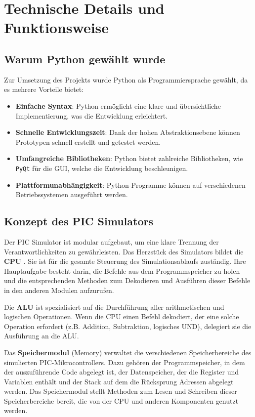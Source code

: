 \chapter{Technische Details und Funktionsweise}

\section{Warum Python gewählt wurde}
Zur Umsetzung des Projekts wurde Python als Programmiersprache gewählt, da es mehrere Vorteile bietet:
\begin{itemize}
    \item \textbf{Einfache Syntax}: Python ermöglicht eine klare und übersichtliche Implementierung, was die Entwicklung erleichtert.
    \item \textbf{Schnelle Entwicklungszeit}: Dank der hohen Abstraktionsebene können Prototypen schnell erstellt und getestet werden.
    \item \textbf{Umfangreiche Bibliotheken}: Python bietet zahlreiche Bibliotheken, wie \texttt{PyQt} für die \ac{GUI}, welche die Entwicklung beschleunigen.
    \item \textbf{Plattformunabhängigkeit}: Python-Programme können auf verschiedenen Betriebssystemen ausgeführt werden.
\end{itemize}


\section{Konzept des PIC Simulators}
Der PIC Simulator ist modular aufgebaut, um eine klare Trennung der Verantwortlichkeiten zu gewährleisten. Das Herzstück des Simulators bildet die \textbf{\ac{CPU}} . Sie ist für die gesamte Steuerung des Simulationsablaufs zuständig. Ihre Hauptaufgabe besteht darin, die Befehle aus dem Programmspeicher zu holen und die entsprechenden Methoden zum Dekodieren und Ausführen dieser Befehle in den anderen Modulen aufzurufen.

Die \textbf{\ac{ALU}} ist spezialisiert auf die Durchführung aller arithmetischen und logischen Operationen. Wenn die \ac{CPU} einen Befehl dekodiert, der eine solche Operation erfordert (z.B. Addition, Subtraktion, logisches UND), delegiert sie die Ausführung an die \ac{ALU}.

Das \textbf{Speichermodul} (Memory) verwaltet die verschiedenen Speicherbereiche des simulierten PIC-Mikrocontrollers. Dazu gehören der Programmspeicher, in dem der auszuführende Code abgelegt ist, der Datenspeicher, der die Register und Variablen enthält und der Stack auf dem die Rücksprung Adressen abgelegt werden. Das Speichermodul stellt Methoden zum Lesen und Schreiben dieser Speicherbereiche bereit, die von der \ac{CPU} und anderen Komponenten genutzt werden.

